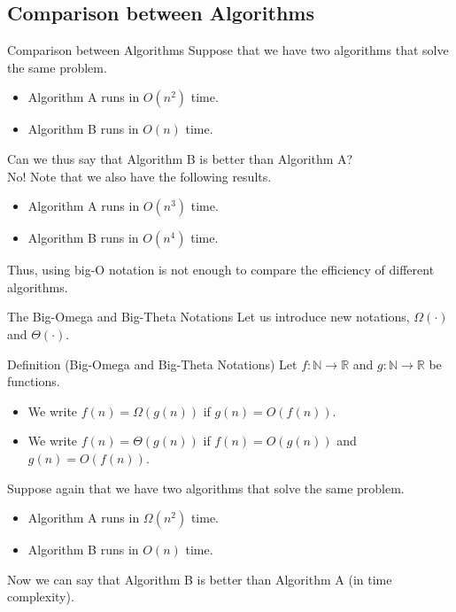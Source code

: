 \documentclass{beamer}
\begin{document}
\subsection{Comparison between Algorithms}
\begin{frame}{Comparison between Algorithms}
  Suppose that we have two algorithms that solve the same problem. \pause
  \begin{itemize}
    \item Algorithm A runs in $O(n^2)$ time. \pause
    \item Algorithm B runs in $O(n)$ time. \pause
  \end{itemize}
  Can we thus say that Algorithm B is better than Algorithm A? \pause \\[.5em]
  No! Note that we also have the following results. \pause
  \begin{itemize}
    \item Algorithm A runs in $O(n^3)$ time. \pause
    \item Algorithm B runs in $O(n^4)$ time. \pause
  \end{itemize}
  Thus, using big-O notation is not enough to compare the efficiency of
  different algorithms.
\end{frame}

\begin{frame}{The Big-Omega and Big-Theta Notations}
  Let us introduce new notations, $\Omega(\cdot)$ and $\Theta(\cdot)$. \pause
  \begin{block}{Definition (Big-Omega and Big-Theta Notations)}
    Let $f: \mathbb{N} \to \mathbb{R}$ and $g: \mathbb{N} \to \mathbb{R}$ be
    functions. \pause
    \begin{itemize}
      \item We write $f(n) = \Omega(g(n))$ if $g(n) = O(f(n))$. \pause
      \item We write $f(n) = \Theta(g(n))$ if $f(n) = O(g(n))$ and
      $g(n) = O(f(n))$. \pause
    \end{itemize}
  \end{block}
  Suppose again that we have two algorithms that solve the same problem. \pause
  \begin{itemize}
    \item Algorithm A runs in $\Omega(n^2)$ time. \pause
    \item Algorithm B runs in $O(n)$ time. \pause
  \end{itemize}
  Now we can say that Algorithm B is better than Algorithm A (in time
  complexity).
\end{frame}
\end{document}
